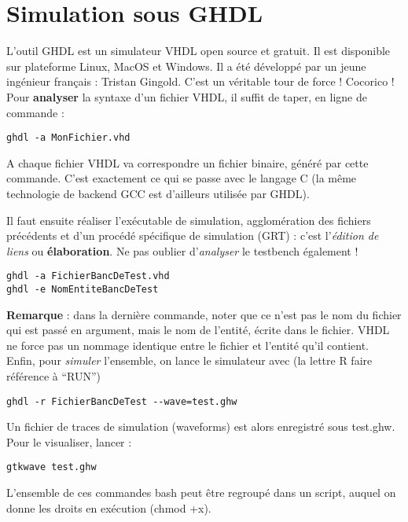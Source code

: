 \documentclass[a4paper,11pt]{article}
\begin{document}
\section{Simulation sous GHDL}
L'outil GHDL est un simulateur VHDL open source et gratuit. Il est disponible sur plateforme Linux, MacOS et Windows. Il a été développé par un jeune ingénieur français : Tristan Gingold. C'est un véritable tour de force ! Cocorico !\\

Pour {\bf analyser} la syntaxe d'un fichier VHDL, il suffit de taper, en ligne de commande :

\begin{verbatim}
ghdl -a MonFichier.vhd
\end{verbatim}

A chaque fichier VHDL va correspondre un fichier binaire, généré par cette commande. C'est exactement ce qui se passe avec le langage C (la même technologie de backend GCC est d'ailleurs utilisée par GHDL).

Il faut ensuite réaliser l'exécutable de simulation, agglomération des fichiers précédents et d'un procédé spécifique de simulation (GRT) : c'est l'{\it édition de liens} ou {\bf élaboration}. Ne pas oublier d'{\it analyser} le testbench également !

\begin{verbatim}
ghdl -a FichierBancDeTest.vhd
ghdl -e NomEntiteBancDeTest
\end{verbatim}

{\bf Remarque} : dans la dernière commande, noter que ce n'est pas le nom du fichier qui est passé en argument, mais le nom de l'entité, écrite dans le fichier. VHDL ne force pas un nommage identique entre le fichier et l'entité qu'il contient.\\

Enfin, pour {\it simuler} l'ensemble, on lance le simulateur avec (la lettre R faire référence à ``RUN'')
\begin{verbatim}
ghdl -r FichierBancDeTest --wave=test.ghw
\end{verbatim}

Un fichier de traces de simulation (waveforms) est alors enregistré sous test.ghw. Pour le visualiser, lancer :
\begin{verbatim}
gtkwave test.ghw
\end{verbatim}

L'ensemble de ces commandes bash peut être regroupé dans un script, auquel on donne les droits en exécution (chmod +x).
\end{document}
